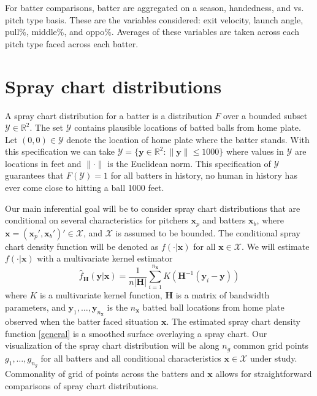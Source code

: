 \documentclass[11pt]{article}
\newcommand{\R}{\mathbb{R}}
\newcommand{\Y}{\mathcal{Y}}
\newcommand{\X}{\mathcal{X}}
\newcommand{\Hbf}{\textbf{H}}
\newcommand{\y}{\textbf{y}}
\newcommand{\x}{\textbf{x}}
\begin{document}
For batter comparisons, batter are aggregated on a season, handedness, and vs. pitch type basis. These are the variables considered: exit velocity, launch angle, pull\%, middle\%, and oppo\%. Averages of these variables are taken across each pitch type faced across each batter.


\section{Spray chart distributions}

A spray chart distribution for a batter is a distribution $F$ over a bounded subset $\Y \in \R^2$. The set $\Y$ contains plausible locations of batted balls from home plate. Let $(0,0) \in \Y$ denote the location of home plate where the batter stands. With this specification we can take $\Y = \{\y \in \R^2: \|\y\| \leq 1000\}$ where values in $\Y$ are locations in feet and $\|\cdot\|$ is the Euclidean norm. This specification of $\Y$ guarantees that $F(\Y) = 1$ for all batters in history, no human in history has ever come close to hitting a ball 1000 feet.

Our main inferential goal will be to consider spray chart distributions that are conditional on several characteristics for pitchers $\x_p$ and batters $\x_b$, where $\x = (\x_p',\x_b')' \in \X$, and $\X$ is assumed to be bounded. The conditional spray chart density function will be denoted as $f(\cdot|\x)$ for all $\x \in \X$. We will estimate $f(\cdot|\x)$ with a multivariate kernel estimator
\begin{equation} \label{general}
  \hat f_\Hbf(\y|\x) = \frac{1}{n|\Hbf|}\sum_{i=1}^{n_\x} K\left(\Hbf^{-1}(\y_i - \y)\right)
\end{equation}
where $K$ is a multivariate kernel function, $\Hbf$ is a matrix of bandwidth parameters, and 
$\y_1,\ldots,\y_{n_\x}$ is the $n_\x$ batted ball locations from home plate observed when the batter faced situation $\x$. The estimated spray chart density function \eqref{general} is a smoothed surface overlaying a spray chart. Our visualization of the spray chart distribution will be along $n_g$ common grid points $g_1,\ldots,g_{n_g}$ for all batters and all conditional characteristics $\x \in \X$ under study. Commonality of grid of points across the batters and $\x$ allows for straightforward comparisons of spray chart distributions.
\end{document}
